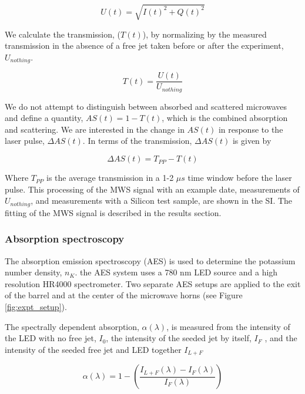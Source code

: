 \begin{equation}
    U(t) = \sqrt{I(t)^2 + Q(t)^2}
\end{equation}

We calculate the transmission, ($T(t)$), by normalizing by the measured transmission in the absence of a free jet taken before or after the experiment, $U_{nothing}$. 

\begin{equation}
    T(t) = \frac{U(t)}{U_{nothing}}
\end{equation}

We do not attempt to distinguish between absorbed and scattered microwaves and define a quantity, $AS(t) = 1- T(t)$, which is the combined absorption and scattering. We are interested in the change in $AS(t)$ in response to the laser pulse, $\Delta AS(t)$. In terms of the transmission, $\Delta AS(t)$ is given by

\begin{equation}
    \Delta AS(t) = T_{PP} - T(t)
\end{equation}

Where $T_{PP}$ is the average transmission in a 1-2 $\mu s$ time window before the laser pulse. This processing of the MWS signal with an example date, measurements of $U_{nothing}$, and measurements with a Silicon test sample, are shown in the SI. The fitting of the MWS signal is described in the results section. 


\subsubsection{Absorption spectroscopy}

The absorption emission spectroscopy (AES) is used to determine the potassium number density, $n_K$. the AES system uses a 780 nm LED source and a high resolution HR4000 spectrometer. Two separate AES setups are applied to the exit of the barrel and at the center of the microwave horns (see Figure \ref{fig:expt_setup}).

The spectrally dependent absorption, $\alpha(\lambda)$, is measured from the intensity of the LED with no free jet, $I_0$, the intensity of the seeded jet by itself, $I_F$ , and the intensity of the seeded free jet and LED together $I_{L+F}$


\begin{equation}
    \alpha(\lambda) = 1 - \left(\frac{I_{L+F}(\lambda) - I_{F}(\lambda)}{I_F(\lambda)}\right)
\end{equation}


